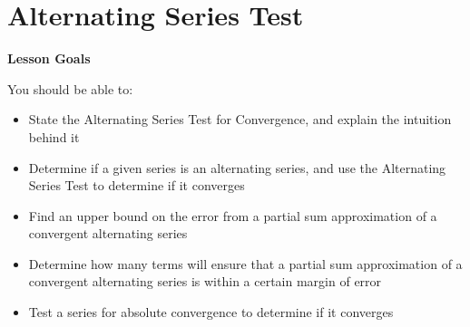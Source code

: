 \documentclass[main]{subfiles}
\begin{document}
\ifSubfilesClassLoaded{%
  \chaptermark{\chaptertwo}
}{}

\section{Alternating Series Test} \label{ws2-9}

\begin{framed}
\centerline{\textbf{Lesson Goals}}

You should be able to:
\begin{itemize}
\item State the Alternating Series Test for Convergence, and explain the intuition behind it
\item Determine if a given series is an alternating series, and use the Alternating Series Test to determine if it converges
\item Find an upper bound on the error from a partial sum approximation of a convergent alternating series
\item Determine how many terms will ensure that a partial sum approximation of a convergent alternating series is within a certain margin of error
\item Test a series for absolute convergence to determine if it converges

\end{itemize}
\end{framed}
\end{document}
